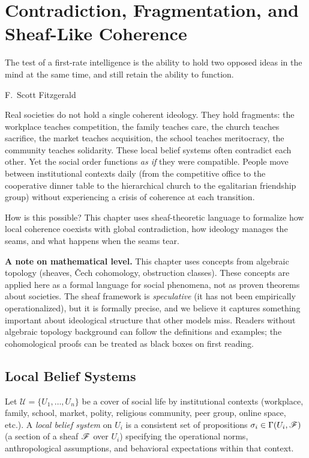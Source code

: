 \chapter{Contradiction, Fragmentation, and Sheaf-Like Coherence}
\label{ch:contradiction-coherence}

\epigraph{The test of a first-rate intelligence is the ability to hold two opposed ideas in the mind at the same time, and still retain the ability to function.}{F.\ Scott Fitzgerald}

\noindent
Real societies do not hold a single coherent ideology.
They hold fragments: the workplace teaches competition, the family teaches care, the church teaches sacrifice, the market teaches acquisition, the school teaches meritocracy, the community teaches solidarity.
These local belief systems often contradict each other.
Yet the social order functions \emph{as if} they were compatible.
People move between institutional contexts daily (from the competitive office to the cooperative dinner table to the hierarchical church to the egalitarian friendship group) without experiencing a crisis of coherence at each transition.

How is this possible?
This chapter uses sheaf-theoretic language to formalize how local coherence coexists with global contradiction, how ideology manages the seams, and what happens when the seams tear.

\textbf{A note on mathematical level.}
This chapter uses concepts from algebraic topology (sheaves, \v{C}ech cohomology, obstruction classes).
These concepts are applied here as a formal language for social phenomena, not as proven theorems about societies.
The sheaf framework is \emph{speculative} (it has not been empirically operationalized), but it is formally precise, and we believe it captures something important about ideological structure that other models miss.
Readers without algebraic topology background can follow the definitions and examples; the cohomological proofs can be treated as black boxes on first reading.


\section{Local Belief Systems}
\label{sec:ch12-local}

\begin{definition}
\label{def:local-belief}
Let $\mathcal{U} = \{U_1, \ldots, U_n\}$ be a cover of social life by institutional contexts (workplace, family, school, market, polity, religious community, peer group, online space, etc.).
A \emph{local belief system} on $U_i$ is a consistent set of propositions $\sigma_i \in \Gamma(U_i, \mathscr{F})$ (a section of a sheaf $\mathscr{F}$ over $U_i$) specifying the operational norms, anthropological assumptions, and behavioral expectations within that context.
\end{definition}

